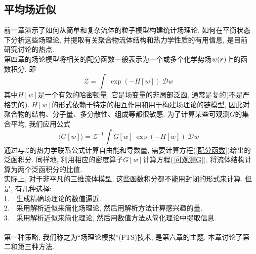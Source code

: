 \subsection{平均场近似}
前一章演示了如何从简单和复杂流体的粒子模型构建统计场理论. 如何在平衡状态下分析这些场理论, 并提取有关聚合物流体结构和热力学性质的有用信息, 是目前研究讨论的热点. \\

第四章的场论模型将相关的配分函数一般表示为一个或多个化学势场$w(\bm{r})$上的函数积分, 即\\
\begin{equation}
	\mathcal{Z}=\int  \ \exp(-H[w])\ \mathcal{D}w \label{配分函数}
\end{equation}
其中$H[w]$是一个有效的哈密顿量, 它是场变量的非局部泛函, 通常是复的(不是严格实的). $H[w]$的形式依赖于特定的相互作用和用于构建场理论的链模型, 因此对聚合物的结构、分子量、多分散性、组成等都很敏感. 为了计算某些可观测$G$的集合平均, 我们应用公式\\
\begin{equation}
	\langle G[w]\rangle = \mathcal{Z}^{-1}\int  G[w]\ \exp(-H[w])\ \mathcal{D}w \label{可观测G}
\end{equation}
通过与$\mathcal{Z}$的热力学联系公式计算自由能和导数量, 需要计算方程(\ref{配分函数})给出的泛函积分. 同样地, 利用相应的密度算子$G[w]$计算方程(\ref{可观测G}), 将流体结构计算为两个泛函积分的比值. \\

实际上, 对于非平凡的三维流体模型, 这些函数积分都不能用封闭的形式来计算. 但是, 有几种选择:\\

1.\ \ 生成精确场理论的数值逼近. \\

2.\ \ 采用解析近似来简化场理论, 然后用解析方法计算感兴趣的量. \\

3.\ \ 采用解析近似来简化理论, 然后用数值方法从简化理论中提取信息. \\
\\
第一种策略, 我们称之为“场理论模拟”(FTS)技术, 是第六章的主题. 本章讨论了第二和第三种方法. \\
